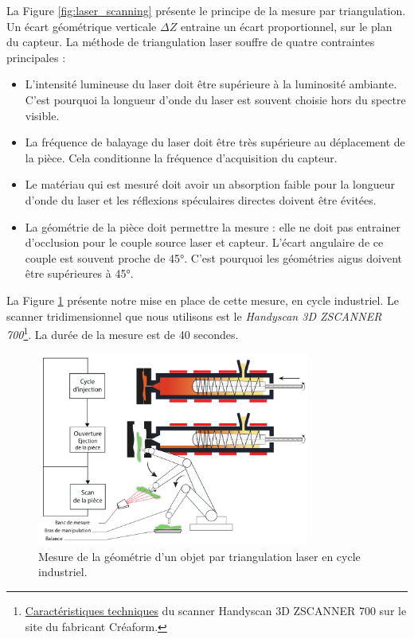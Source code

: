 La Figure \ref{fig:laser_scanning} présente le principe de la mesure par triangulation.
Un écart géométrique verticale $\Delta Z$ entraine un écart proportionnel, sur le plan du capteur.
La méthode de triangulation laser souffre de quatre contraintes principales :
\begin{itemize}
	\item L'intensité lumineuse du laser doit être supérieure à la luminosité ambiante. C'est pourquoi la longueur d'onde du laser est souvent choisie hors du spectre visible.
	\item La fréquence de balayage du laser doit être très supérieure au déplacement de la pièce. Cela conditionne la fréquence d'acquisition du capteur.
	\item Le matériau qui est mesuré doit avoir un absorption faible pour la longueur d'onde du laser et les réflexions spéculaires directes doivent être évitées.
	\item La géométrie de la pièce doit permettre la mesure : elle ne doit pas entrainer d'occlusion pour le couple source laser et capteur. L'écart angulaire de ce couple est souvent proche de 45°. C'est pourquoi les géométries aigus doivent être supérieures à 45°.
\end{itemize}

La Figure \ref{fig:online_scan} présente notre mise en place de cette mesure, en cycle industriel.
Le scanner tridimensionnel que nous utilisons est le \textit{Handyscan 3D ZSCANNER 700}\footnote{\href{https://www.creaform3d.com/fr/soutien-la-clientele/produits-retires/handyscan-3d-de-1re-generation-zscanner-700}{Caractéristiques techniques} du scanner Handyscan 3D ZSCANNER 700 sur le site du fabricant Créaform.}.
La durée de la mesure est de 40 secondes.

\begin{figure}[bhtp]
	\centering
	\includegraphics[width=0.8\textwidth]{../Chap2/Figures/online_scan.pdf}
	\caption{Mesure de la géométrie d'un objet par triangulation laser en cycle industriel.}
	\label{fig:online_scan}
\end{figure}

